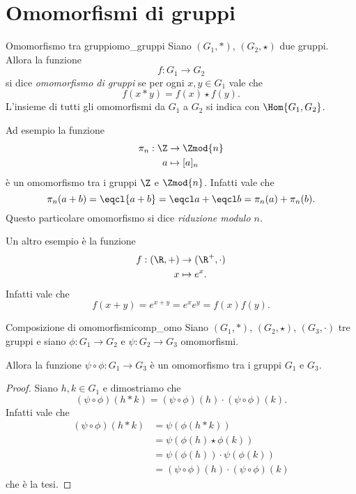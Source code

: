 \section{Omomorfismi di gruppi}

\begin{definition}{Omomorfismo tra gruppi}{omo_gruppi}
    Siano $(G_1, *)$, $(G_2, \star)$ due gruppi. Allora la funzione \[
        f : G_1 \to G_2    
    \] si dice \emph{omomorfismo di gruppi} se per ogni $x, y \in G_1$ vale che \begin{equation}
        f(x * y) = f(x) \star f(y).
    \end{equation}
    L'insieme di tutti gli omomorfismi da $G_1$ a $G_2$ si indica con $\Hom{G_1, G_2}$.
\end{definition}

\begin{example}
    Ad esempio la funzione \begin{align*}
    \pi_n : \Z &\to \Zmod{n}\\
    a &\mapsto [a]_n
\end{align*} è un omomorfismo tra i gruppi $\Z$ e $\Zmod{n}$. Infatti vale che \[
    \pi_n(a + b) = \eqcl{a + b} = \eqcl a + \eqcl b = \pi_n(a) + \pi_n(b).
\] Questo particolare omomorfismo si dice \emph{riduzione modulo $n$}.
\end{example}

\begin{example}
    Un altro esempio è la funzione \begin{align*}
    f : (\R, +) &\to (\R^+, {\cdot})\\
    x &\mapsto e^x.
\end{align*} Infatti vale che \[
    f(x + y) = e^{x + y} = e^xe^y = f(x)f(y).    
\]
\end{example}

\begin{proposition}
    {Composizione di omomorfismi}{comp_omo}
    Siano $(G_1, *)$, $(G_2, \star)$, $(G_3, \cdot)$ tre gruppi e siano $\phi : G_1 \to G_2$ e $\psi : G_2 \to G_3$ omomorfismi.

    Allora la funzione $\psi \circ \phi : G_1 \to G_3$ è un omomorfismo tra i gruppi $G_1$ e $G_3$.
\end{proposition}
\begin{proof}
    Siano $h, k \in G_1$ e dimostriamo che \[
        (\psi \circ \phi)(h * k) = (\psi \circ \phi)(h) \cdot (\psi \circ \phi)(k).
    \] Infatti vale che
    \begin{align*}
        (\psi \circ \phi)(h * k) &= \psi(\phi(h * k)) \tag{$\phi$ omo.}\\
        &= \psi(\phi(h) \star \phi(k)) \tag{$\psi$ omo.}\\
        &= \psi(\phi(h)) \cdot \psi(\phi(k)) \\
        &= (\psi \circ \phi)(h) \cdot (\psi \circ \phi)(k)
    \end{align*}
    che è la tesi.
\end{proof}

